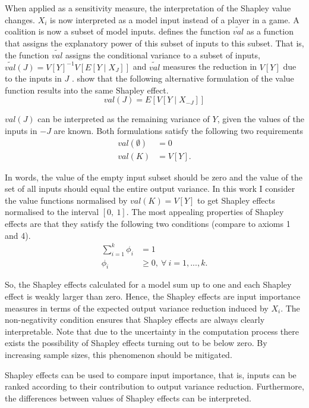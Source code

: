 When applied as a sensitivity measure, the interpretation of the Shapley value changes. $X_i$ is now interpreted as a model input instead of a player in a game. A coalition is now a subset of model inputs. \citet{O14} defines the function $\widetilde{val}$ as a function that assigns the explanatory power of this subset of inputs to this subset. That is, the function $\widetilde{val}$ assigns the conditional variance to a subset of inputs, $\widetilde{val}(J)=V[Y]^{-1}V[E[Y \mid X_J]]$ and $\widetilde{val}$ measures the reduction in $V[Y]$ due to the inputs in $J$ \citep{SNS16}. \citep{SNS16} show that the following alternative formulation of the value function results into the same Shapley effect.
\begin{equation}
val(J)=E[V[Y \mid X_{- J}]]
\end{equation}

\noindent $val(J)$ can be interpreted as the remaining variance of $Y$, given the values of the inputs in $- J$ are known. Both formulations satisfy the following two requirements
\begin{align}
val(\emptyset)& = 0\\
val(K)& = V[Y].
\end{align}

\noindent In words, the value of the empty input subset should be zero and the value of the set of all inputs should equal the entire output variance. In this work I consider the value functions normalised by $val(K)=V[Y] $ to get Shapley effects normalised to the interval $ [0,\ 1] $. The most appealing properties of Shapley effects are that they satisfy the following two conditions (compare to axioms 1 and 4).
\begin{align}
\sum_{i=1}^{k}\phi_i& = 1\\
\phi_i& \geq 0,\ \forall \ i=1, ..., k.
\end{align}

\noindent So, the Shapley effects calculated for a model sum up to one and each Shapley effect is weakly larger than zero. Hence, the Shapley effects are input importance measures in terms of the expected output variance reduction induced by $X_i$. The non-negativity condition ensures that Shapley effects are always clearly interpretable. Note that due to the uncertainty in the computation process there exists the possibility of Shapley effects turning out to be below zero. By increasing sample sizes, this phenomenon should be mitigated.

Shapley effects can be used to compare input importance, that is, inputs can be ranked according to their contribution to output variance reduction. Furthermore, the differences between values of Shapley effects can be interpreted.

